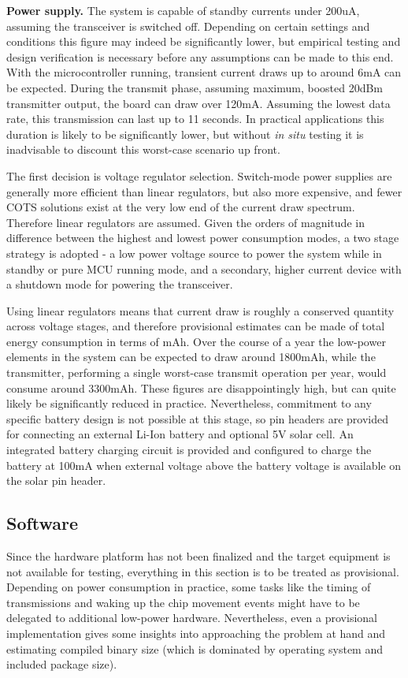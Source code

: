 \documentclass[10pt,nocopyrightspace]{ewsn-proc}
\begin{document}
\textbf{Power supply.} The system is capable of standby currents under 200uA, assuming the transceiver is switched off. Depending on certain settings and conditions this figure may indeed be significantly lower, but empirical testing and design verification is necessary before any assumptions can be made to this end. With the microcontroller running, transient current draws up to around 6mA can be expected. During the transmit phase, assuming maximum, boosted 20dBm transmitter output, the board can draw over 120mA. Assuming the lowest data rate, this transmission can last up to 11 seconds. In practical applications this duration is likely to be significantly lower, but without \textit{in situ} testing it is inadvisable to discount this worst-case scenario up front. 

The first decision is voltage regulator selection. Switch-mode power supplies are generally more efficient than linear regulators, but also more expensive, and fewer COTS solutions exist at the very low end of the current draw spectrum. Therefore linear regulators are assumed. Given the orders of magnitude in difference between the highest and lowest power consumption modes, a two stage strategy is adopted - a low power voltage source to power the system while in standby or pure MCU running mode, and a secondary, higher current device with a shutdown mode for powering the transceiver.

Using linear regulators means that current draw is roughly a conserved quantity across voltage stages, and therefore provisional estimates can be made of total energy consumption in terms of mAh. Over the course of a year the low-power elements in the system can be expected to draw around 1800mAh, while the transmitter, performing a single worst-case transmit operation per year, would consume around 3300mAh. These figures are disappointingly high, but can quite likely be significantly reduced in practice. Nevertheless, commitment to any specific battery design is not possible at this stage, so pin headers are provided for connecting an external Li-Ion battery and optional 5V solar cell. An integrated battery charging circuit is provided and configured to charge the battery at 100mA when external voltage above the battery voltage is available on the solar pin header.

\subsection{Software}
Since the hardware platform has not been finalized and the target equipment is not available for testing, everything in this section is to be treated as provisional. Depending on power consumption in practice, some tasks like the timing of transmissions and waking up the chip movement events might have to be delegated to additional low-power hardware. Nevertheless, even a provisional implementation gives some insights into approaching the problem at hand and estimating compiled binary size (which is dominated by operating system and included package size).
\end{document}
